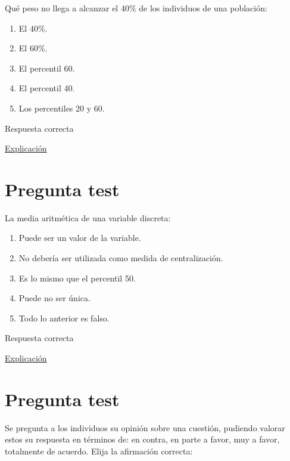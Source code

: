 \documentclass[
]{book}
\providecommand{\tightlist}{%
  \setlength{\itemsep}{0pt}\setlength{\parskip}{0pt}}
\begin{document}
Qué peso no llega a alcanzar el 40\% de los individuos de una población:

\begin{enumerate}
\def\labelenumi{\alph{enumi})}
\tightlist
\item
  El 40\%.
\item
  El 60\%.
\item
  El percentil 60.
\item
  El percentil 40.
\item
  Los percentiles 20 y 60.
\end{enumerate}

Respuesta correcta

\href{https://1fjmanzano.github.io/bioestadistica/medidas-de-posicio\%CC\%81n-dispersio\%CC\%81n-y-forma.html\#medidas-de-posicio\%CC\%81n-no-centrales}{Explicación}

\hypertarget{pregunta-test-69}{%
\section{Pregunta test}\label{pregunta-test-69}}

La media aritmética de una variable discreta:

\begin{enumerate}
\def\labelenumi{\alph{enumi})}
\tightlist
\item
  Puede ser un valor de la variable.
\item
  No debería ser utilizada como medida de centralización.
\item
  Es lo mismo que el percentil 50.
\item
  Puede no ser única.
\item
  Todo lo anterior es falso.
\end{enumerate}

Respuesta correcta

\href{https://1fjmanzano.github.io/bioestadistica/medidas-de-posicio\%CC\%81n-dispersio\%CC\%81n-y-forma.html\#medidas-de-posicio\%CC\%81n-centrales}{Explicación}

\hypertarget{pregunta-test-70}{%
\section{Pregunta test}\label{pregunta-test-70}}

Se pregunta a los individuos su opinión sobre una cuestión, pudiendo valorar estos su respuesta en términos de: en contra, en parte a favor, muy a favor, totalmente de acuerdo. Elija la afirmación correcta:
\end{document}

